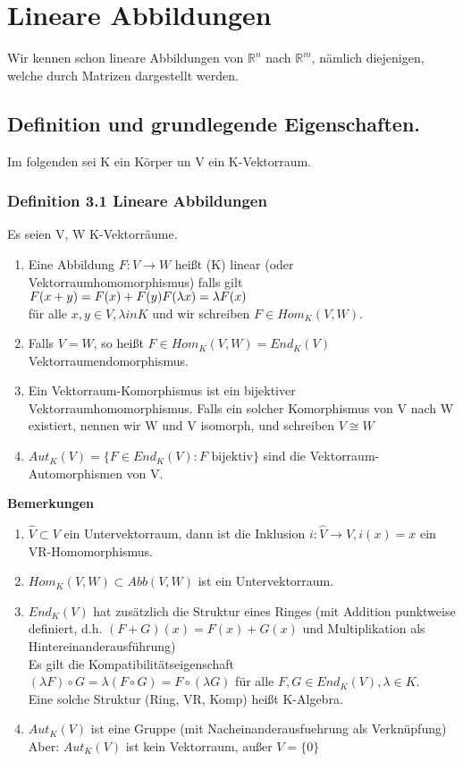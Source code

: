 \documentclass{scrartcl}
\newcommand{\lb}{\lambda}
\newcommand{\R}{\mathbb{R}}
\begin{document}
\section{Lineare Abbildungen}
Wir kennen schon lineare Abbildungen von \(\R^n\) nach \(\R^m\), n\"amlich diejenigen, welche durch Matrizen dargestellt werden.

\subsection{Definition und grundlegende Eigenschaften.}
Im folgenden sei K ein K\"orper un V ein K-Vektorraum.
\subsubsection{Definition 3.1 Lineare Abbildungen}
Es seien V, W K-Vektorr\"aume.
\begin{enumerate}
\item{
Eine Abbildung \(F : V \to W\) hei\ss{}t (K) linear (oder Vektorraumhomomorphismus) falls gilt\\
\(F(x + y) = F(x) + F(y)\\
F(\lb x) = \lb F(x)\)\\
f\"ur alle \(x, y \in V, \lb in K\) und wir schreiben \(F \in Hom_K(V, W)\).
}
\item{Falls \(V = W\), so hei\ss{}t \(F \in Hom_K(V, W) = End_K(V)\) Vektorraumendomorphismus.}
\item{Ein Vektorraum-Komorphismus ist ein bijektiver Vektorraumhomomorphismus. Falls ein solcher Komorphismus von V nach W existiert, nennen wir W und V isomorph, und schreiben \(V \cong W\)}
\item{\(Aut_K(V) = \{F \in End_K(V) : F \text{ bijektiv}\}\) sind die Vektorraum-Automorphismen von V.}
\end{enumerate}
\textbf{Bemerkungen}
\begin{enumerate}
\item{\(\hat{V} \subset V\) ein Untervektorraum, dann ist die Inklusion \(i : \hat{V} \to V, i(x) = x\) ein VR-Homomorphismus.}
\item{\(Hom_K(V, W) \subset Abb(V, W)\) ist ein Untervektorraum.}
\item{\(End_K(V)\) hat zus\"atzlich die Struktur eines Ringes (mit Addition punktweise definiert, d.h. \((F + G)(x) = F(x) + G(x)\) und Multiplikation als Hintereinanderausf\"uhrung)\\
Es gilt die Kompatibilit\"atseigenschaft \\
\((\lb F) \circ G = \lb (F \circ G) = F \circ (\lb G)\) f\"ur alle \(F, G \in End_K(V), \lb \in K\).\\
Eine solche Struktur (Ring, VR, Komp) hei\ss{}t K-Algebra.}
\item{\(Aut_K(V)\) ist eine Gruppe (mit Nacheinanderausfuehrung als Verkn\"upfung)\\
Aber: \(Aut_K(V)\) ist kein Vektorraum, au\ss{}er \(V = \{0\}\)}
\end{enumerate}
\end{document}
